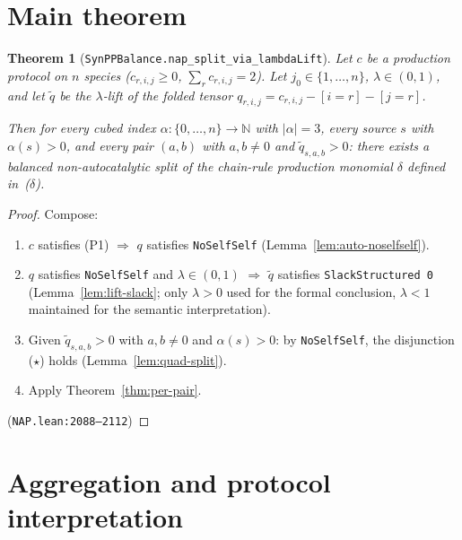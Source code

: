 \documentclass[11pt]{article}
\newtheorem{theorem}{Theorem}
\newcommand{\N}{\mathbb{N}}
\newcommand{\slack}{0}
\begin{document}
\section{Main theorem}

\begin{theorem}[\texttt{SynPPBalance.nap\_split\_via\_lambdaLift}]
\label{thm:main}
Let $c$ be a production protocol on $n$ species ($c_{r,i,j} \ge 0$,
$\sum_r c_{r,i,j} = 2$). Let $j_0 \in \{1, \dots, n\}$, $\lambda \in (0,1)$,
and let $\widetilde q$ be the $\lambda$-lift of the folded tensor
$q_{r,i,j} = c_{r,i,j} - [i=r] - [j=r]$.

Then for every cubed index $\alpha : \{0, \dots, n\} \to \N$ with
$|\alpha| = 3$, every source $s$ with $\alpha(s) > 0$, and every pair
$(a, b)$ with $a, b \ne \slack$ and $\widetilde q_{s, a, b} > 0$:
there exists a balanced non-autocatalytic split of the chain-rule
production monomial $\delta$ defined in~($\delta$).
\end{theorem}
\begin{proof}
Compose:
\begin{enumerate}
  \item $c$ satisfies (P1) $\Rightarrow$ $q$ satisfies \verb|NoSelfSelf|
    (Lemma~\ref{lem:auto-noselfself}).
  \item $q$ satisfies \verb|NoSelfSelf| and $\lambda \in (0, 1)$
    $\Rightarrow$ $\widetilde q$ satisfies \verb|SlackStructured 0|
    (Lemma~\ref{lem:lift-slack}; only $\lambda > 0$ used for the formal
    conclusion, $\lambda < 1$ maintained for the semantic interpretation).
  \item Given $\widetilde q_{s, a, b} > 0$ with $a, b \ne \slack$ and
    $\alpha(s) > 0$: by \verb|NoSelfSelf|, the disjunction ($\star$) holds
    (Lemma~\ref{lem:quad-split}).
  \item Apply Theorem~\ref{thm:per-pair}.
\end{enumerate}
\hfill (\texttt{NAP.lean:2088--2112})
\end{proof}

\section{Aggregation and protocol interpretation}
\end{document}
